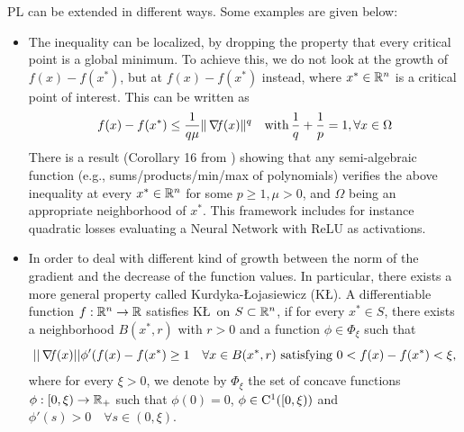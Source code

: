 \documentclass[10pt,a4paper]{article}
\begin{document}
\begin{remark}
	PL can be extended in different ways. Some examples are given below:
	\begin{itemize}
		\item The inequality can be localized, by dropping the property that every critical point is
		a global minimum. To achieve this, we do not look at the growth of $f(x)-f(x^*)$, but at $f(x)-f(x^*)$
		instead, where $x^*\in \mathbb{R}^n$ is a critical point of interest. This can be written as 
		$$ f(x)-f(x^*)\leq \frac{1}{q\mu}\|\operatorname*{\mathit{\nabla \!f}}(x)\|^q \quad  \mathord{\mathrm{with }}\, \frac{1}{q}+\frac{1}{p}=1, \forall x\in \Omega$$
		There is a result (Corollary 16 from \cite{bolte07a}) showing that any semi-algebraic function (e.g., sums/products/min/max of polynomials) verifies the above inequality at every $x^* \in \mathbb{R}^n$ for some $p\geq 1, \mu > 0$, and $\Omega$ being an appropriate neighborhood of $x^*$. This framework includes for instance quadratic losses evaluating a Neural Network with ReLU as activations.
		\item In order to deal with different kind of growth between the norm of the gradient and the decrease of the function values. In particular, there exists a more general property called Kurdyka-\L ojasiewicz (K\L). A differentiable function $f:\mathbb{R}^n\to\mathbb{R}$ satisfies K\L $\,$ on $S\subset \mathbb{R}^n$, if for every $x^*\in S$, there exists a neighborhood $B(x^*,r)$ with $r>0$ and a function $\phi \in \Phi_\xi$ such that 
		$$||\operatorname*{\mathit{\nabla \!f}}(x)|| \phi'(f(x) - f(x^*) \geq 1 \quad \forall x \in B(x^*,r) \text{ satisfying } 0<f(x)-f(x^*)<\xi,$$
		where for every $\xi>0$, we denote by $\Phi_\xi$ the set of concave functions $\phi:[0,\xi)\to\mathbb{R}_+$ such that $\phi(0)=0$, $\phi\in \mathord{\mathrm{C^1}}([0,\xi))$ and $\phi'(s)>0 \quad \forall s\in (0,\xi)$. 
	\end{itemize}
\end{remark}
\end{document}
